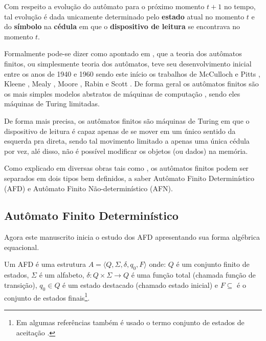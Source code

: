 Com respeito a evolução do autômato para o próximo momento $t+1$ no tempo, tal evolução é dada unicamente determinado pelo \textbf{estado} atual no momento $t$ e do \textbf{símbolo} na \textbf{cédula} em que o \textbf{dispositivo de leitura} se encontrava no momento $t$. 

Formalmente pode-se dizer como apontado em \cite{valdi2020phd}, que a teoria dos autômatos finitos, ou simplesmente teoria dos autômatos, teve seu desenvolvimento inicial entre os anos de 1940 e 1960 sendo este início os trabalhos de McCulloch e Pitts \cite{mcculloch1943}, Kleene \cite{kleene1951}, Mealy \cite{mealy1955}, Moore \cite{moore1956}, Rabin e Scott \cite{rabin1963, rabin1959}. De forma geral os autômatos finitos são os mais simples modelos abstratos de máquinas de computação \cite{farias2017}, sendo eles máquinas de Turing limitadas. 

De forma mais precisa, os autômatos finitos são máquinas de Turing \cite{turing1937} em que o dispositivo de leitura é capaz apenas de se mover em um único sentido da esquerda pra direta, sendo tal movimento limitado a apenas uma única cédula por vez, alé disso, não é possível modificar os objetos (ou dados) na memória.

Como explicado em diversas obras tais como \cite{benjaLivro2010, hopcroft2008, linz2006, menezes1998LFA}, os autômatos finitos podem ser separados em dois tipos bem definidos, a saber Autômato Finito Determinístico (AFD) e Autômato Finito Não-determinístico (AFN).

\subsection{Autômato Finito Determinístico}\label{subsec:AFD}

Agora este manuscrito inicia o estudo dos AFD apresentando sua forma algébrica equacional.

\begin{definition}\label{def:AFD}
	Um AFD é uma estrutura $A = \langle Q, \Sigma, \delta, q_0, F\rangle$ onde: $Q$ é um conjunto finito de estados, $\Sigma$ é um alfabeto, $\delta : Q \times \Sigma \rightarrow Q$ é uma função total (chamada função de transição), $q_0 \in Q$ é um estado destacado (chamado estado inicial) e $F \subseteq$ é o conjunto de estados finais\footnote{Em algumas referências também é usado o termo conjunto de estados de aceitação \cite{de2010}.}.
\end{definition}

